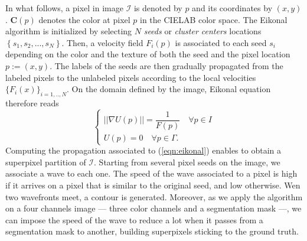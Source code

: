\documentclass{article}
\begin{document}
            In what follows, a pixel in image $\mathcal{I}$ is denoted by $p$ and its coordinates by $(x, y)$. $\mathbf{C}(p)$ denotes the color at pixel $p$ in the CIELAB color space. The Eikonal algorithm is initialized by selecting $N$ \textit{seeds} or \textit{cluster centers} locations $\left\{s_1, s_2, ..., s_N \right\}$. Then, a velocity field $F_i(p)$ is associated to each seed $s_i$ depending on the color and the texture of both the seed and the pixel location $p:=(x, y)$. The labels of the seeds are then gradually propagated from the labeled pixels to the unlabeled pixels according to the local velocities $\{F_i(x)\}_{i = 1, .., N}$. On the domain defined by the image, Eikonal equation therefore reads
            \begin{equation}
              \begin{cases}
                ||\nabla U(p)|| = \dfrac{1}{F(p)}\quad \forall p \in I\\
                U(p) = 0    \quad \forall p \in \Gamma.
              \end{cases}
              \label{eqn:eikonal}
            \end{equation}
            Computing the propagation associated to (\ref{eqn:eikonal}) enables to obtain a superpixel partition of $\mathcal{I}$.
            Starting from several pixel seeds on the image, we associate a wave to each one. The speed of the wave associated to a pixel is high if it arrives on a pixel that is similar to the original seed, and low otherwise. Wen two wavefronts meet, a contour is generated. Moreover, as we apply the algorithm on a four channels image --- three color channels and a segmentation mask ---, we can impose the speed of the wave to reduce a lot when it passes from a segmentation mask to another, building superpixels sticking to the ground truth.


\newpage
\end{document}
